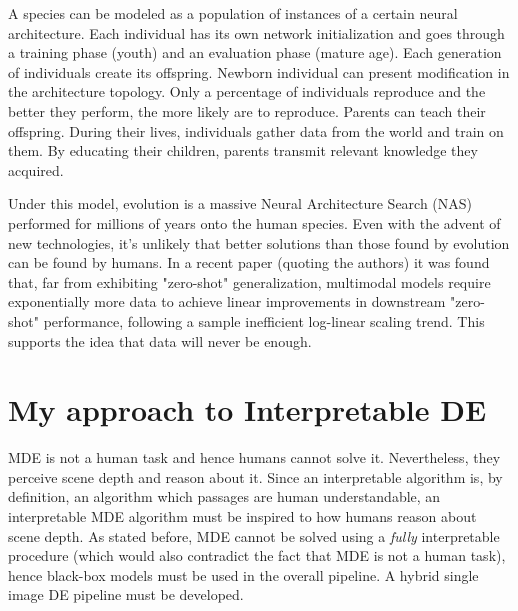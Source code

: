 A species can be modeled as a population of instances of a certain neural architecture.
Each individual has its own network initialization and goes through a training phase (youth) and an evaluation phase (mature age).
Each generation of individuals create its offspring.
Newborn individual can present modification in the architecture topology.
Only a percentage of individuals reproduce and the better they perform, the more likely are to reproduce.
Parents can teach their offspring.
During their lives, individuals gather data from the world and train on them.
By educating their children, parents transmit relevant knowledge they acquired.

Under this model, evolution is a massive Neural Architecture Search (NAS) performed for millions of years onto the human species.
Even with the advent of new technologies, it's unlikely that better solutions than those found by evolution can be found by humans.
In a recent paper \cite{udandarao2024zeroshotexponentialdatapretraining} (quoting the authors) it was found that, far from exhibiting "zero-shot" generalization, multimodal models require exponentially more data to achieve linear improvements in downstream "zero-shot" performance, following a sample inefficient log-linear scaling trend.
This supports the idea that data will never be enough.

\section{My approach to Interpretable DE}
MDE is not a human task and hence humans cannot solve it.
Nevertheless, they perceive scene depth and reason about it.
Since an interpretable algorithm is, by definition, an algorithm which passages are human understandable, an interpretable MDE algorithm must be inspired to how humans reason about scene depth.
As stated before, MDE cannot be solved using a \textit{fully} interpretable procedure (which would also contradict the fact that MDE is not a human task), hence black-box models must be used in the overall pipeline.
A hybrid single image DE pipeline must be developed.

